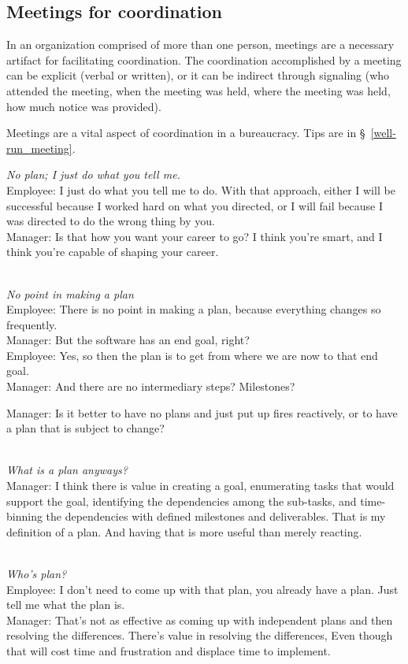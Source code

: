 \subsection{Meetings for coordination\label{sec:meetings-for-coordination}}
In an organization comprised of more than one person, meetings are a necessary artifact for facilitating coordination. The coordination accomplished by a meeting can be explicit (verbal or written), or it can be indirect through signaling (who attended the meeting, when the meeting was held, where the meeting was held, how much notice was provided). 

Meetings are a vital aspect of coordination in a bureaucracy. Tips are in \S~\ref{well-run_meeting}.


\textit{No plan; I just do what you tell me.}\\
Employee: I just do what you tell me to do. With that approach, either I will be successful because I worked hard on what you directed, or I will fail because I was directed to do the wrong thing by you.\\
Manager: Is that how you want your career to go? I think you're smart, and I think you're capable of shaping your career.

\ \\

\textit{No point in making a plan}\\
Employee: There is no point in making a plan, because everything changes so frequently.\\
Manager: But the software has an end goal, right?\\

Employee: Yes, so then the plan is to get from where we are now to that end goal.\\
Manager: And there are no intermediary steps? Milestones?

Manager: Is it better to have no plans and just put up fires reactively, or to have a plan that is subject to change?

\ \\

\textit{What is a plan anyways?}\\
Manager: I think there is value in creating a goal, enumerating tasks that would support the goal, identifying the dependencies among the sub-tasks, and time-binning the dependencies with defined milestones and deliverables. That is my definition of a plan. And having that is more useful than merely reacting.

\ \\

\textit{Who's plan?}\\
Employee: I don't need to come up with that plan, you already have a plan. Just tell me what the plan is.\\

Manager: That's not as effective as coming up with independent plans and then resolving the differences. There's value in resolving the differences, Even though that will cost time and frustration and displace time to implement.